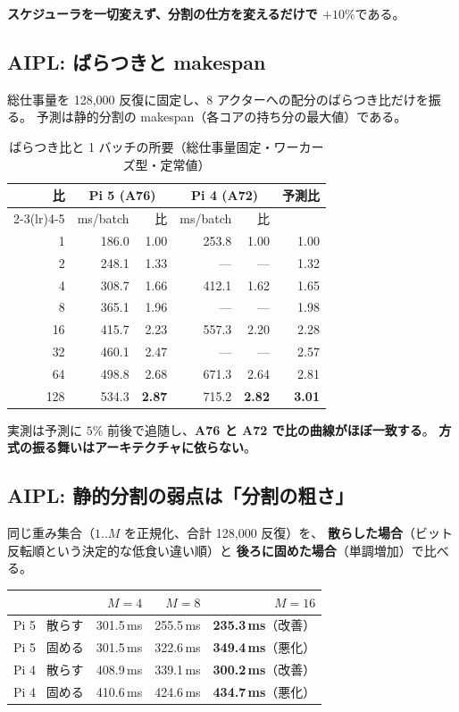 \documentclass[a4paper,11pt]{ltjsarticle}
\begin{document}
\noindent
\textbf{スケジューラを一切変えず、分割の仕方を変えるだけで $+10\%$}である。

\subsection{AIPL: ばらつきと makespan}
総仕事量を 128{,}000 反復に固定し、8 アクターへの配分のばらつき比だけを振る。
予測は静的分割の makespan（各コアの持ち分の最大値）である。

\begin{table}[t]
\centering
\caption{ばらつき比と 1 バッチの所要（総仕事量固定・ワーカーズ型・定常値）}
\label{tab:spread}
\begin{tabular}{rrrrrr}
\toprule
比 & \multicolumn{2}{c}{Pi 5 (A76)} & \multicolumn{2}{c}{Pi 4 (A72)} & 予測比 \\
\cmidrule(lr){2-3}\cmidrule(lr){4-5}
 & ms/batch & 比 & ms/batch & 比 & \\
\midrule
1 & 186.0 & 1.00 & 253.8 & 1.00 & 1.00 \\
2 & 248.1 & 1.33 & --- & --- & 1.32 \\
4 & 308.7 & 1.66 & 412.1 & 1.62 & 1.65 \\
8 & 365.1 & 1.96 & --- & --- & 1.98 \\
16 & 415.7 & 2.23 & 557.3 & 2.20 & 2.28 \\
32 & 460.1 & 2.47 & --- & --- & 2.57 \\
64 & 498.8 & 2.68 & 671.3 & 2.64 & 2.81 \\
128 & 534.3 & \textbf{2.87} & 715.2 & \textbf{2.82} & \textbf{3.01} \\
\bottomrule
\end{tabular}
\end{table}

\noindent
実測は予測に $5\%$ 前後で追随し、\textbf{A76 と A72 で比の曲線がほぼ一致する}。
\textbf{方式の振る舞いはアーキテクチャに依らない}。

\subsection{AIPL: 静的分割の弱点は「分割の粗さ」}
同じ重み集合（$1..M$ を正規化、合計 128{,}000 反復）を、
\textbf{散らした場合}（ビット反転順という決定的な低食い違い順）と
\textbf{後ろに固めた場合}（単調増加）で比べる。

\begin{center}
\begin{tabular}{lrrr}
\toprule
 & $M=4$ & $M=8$ & $M=16$ \\
\midrule
Pi 5 \ 散らす & 301.5\,ms & 255.5\,ms & \textbf{235.3\,ms}（改善）\\
Pi 5 \ 固める & 301.5\,ms & 322.6\,ms & \textbf{349.4\,ms}（悪化）\\
Pi 4 \ 散らす & 408.9\,ms & 339.1\,ms & \textbf{300.2\,ms}（改善）\\
Pi 4 \ 固める & 410.6\,ms & 424.6\,ms & \textbf{434.7\,ms}（悪化）\\
\bottomrule
\end{tabular}
\end{center}
\end{document}
